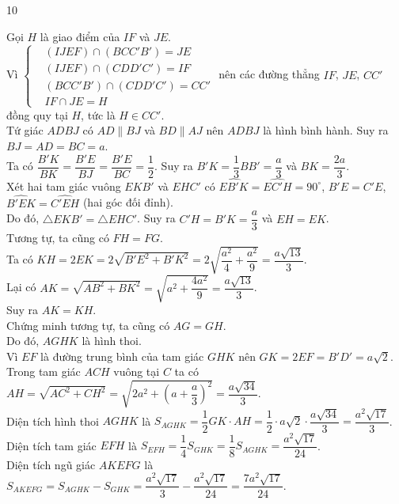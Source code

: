 \begin{indapan}{10}
\begin{ex}
{{
}
\noindent
Gọi $H$ là giao điểm của $IF$ và $JE$.\\
Vì $\left\{\begin{aligned}&(IJEF)\cap \left(BCC'B'\right)=JE \\&(IJEF)\cap \left(CDD'C'\right)=IF \\&\left(BCC'B'\right)\cap \left(CDD'C'\right)=CC' \\&IF\cap JE=H\end{aligned}\right.$ nên các đường thẳng $IF$, $JE$, $CC'$ đồng quy tại $H$, tức là $H\in CC'$.\\
Tứ giác $ADBJ$ có $AD\parallel BJ$ và $BD\parallel AJ$ nên $ADBJ$ là hình bình hành. Suy ra $BJ=AD=BC=a$.\\
Ta có $\dfrac{B'K}{BK}=\dfrac{B'E}{BJ} = \dfrac{B'E}{BC}=\dfrac{1}{2}$. Suy ra $B'K=\dfrac{1}{3}BB'=\dfrac{a}{3}$ và $BK=\dfrac{2a}{3}$.\\
Xét hai tam giác vuông $EKB'$ và $EHC'$ có $\widehat{EB'K}=\widehat{EC'H}=90^\circ$, $B'E=C'E$, $\widehat{B'EK}=\widehat{C'EH}$ (hai góc đối đỉnh).\\
Do đó, $\triangle EKB' = \triangle EHC'$. Suy ra $C'H=B'K=\dfrac{a}{3}$ và $EH=EK$.\\
Tương tự, ta cũng có $FH=FG$.\\
Ta có $KH=2EK=2\sqrt{B'E^2+B'K^2} = 2\sqrt{\dfrac{a^2}{4}+\dfrac{a^2}{9}} = \dfrac{a\sqrt{13}}{3}$.\\
Lại có $AK=\sqrt{AB^2+BK^2} = \sqrt{a^2+\dfrac{4a^2}{9}} = \dfrac{a\sqrt{13}}{3}$.\\
Suy ra $AK=KH$.\\
Chứng minh tương tự, ta cũng có $AG=GH$.\\
Do đó, $AGHK$ là hình thoi.\\
Vì $EF$ là đường trung bình của tam giác $GHK$ nên $GK=2EF=B'D'=a\sqrt{2}$.\\
Trong tam giác $ACH$ vuông tại $C$ ta có $AH=\sqrt{AC^2+CH^2} = \sqrt{2a^2+\left(a+\dfrac{a}{3}\right)^2} = \dfrac{a\sqrt{34}}{3}$.\\
Diện tích hình thoi $AGHK$ là $S_{AGHK}=\dfrac{1}{2}GK\cdot AH = \dfrac{1}{2}\cdot a\sqrt{2}\cdot \dfrac{a\sqrt{34}}{3} = \dfrac{a^2\sqrt{17}}{3}$.\\
Diện tích tam giác $EFH$ là $S_{EFH}=\dfrac{1}{4}S_{GHK}=\dfrac{1}{8}S_{AGHK} = \dfrac{a^2\sqrt{17}}{24}$.\\
Diện tích ngũ giác $AKEFG$ là $S_{AKEFG}=S_{AGHK}-S_{GHK} = \dfrac{a^2\sqrt{17}}{3}-\dfrac{a^2\sqrt{17}}{24} = \dfrac{7a^2\sqrt{17}}{24}$.
}
\end{ex}


\end{indapan}
